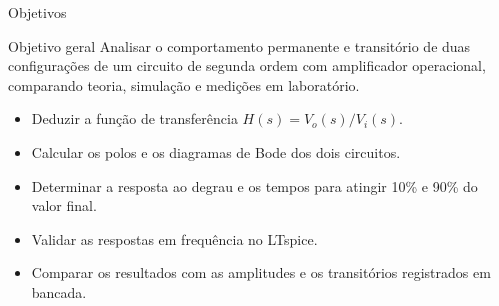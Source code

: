 \begin{frame}{Objetivos}
  \begin{block}{Objetivo geral}
    Analisar o comportamento permanente e transitório de duas configurações de
    um circuito de segunda ordem com amplificador operacional, comparando teoria,
    simulação e medições em laboratório.
  \end{block}

  \begin{itemize}
    \item Deduzir a função de transferência $H(s)=V_o(s)/V_i(s)$.
    \item Calcular os polos e os diagramas de Bode dos dois circuitos.
    \item Determinar a resposta ao degrau e os tempos para atingir 10\% e 90\% do valor final.
    \item Validar as respostas em frequência no LTspice.
    \item Comparar os resultados com as amplitudes e os transitórios registrados em bancada.
  \end{itemize}
\end{frame}
